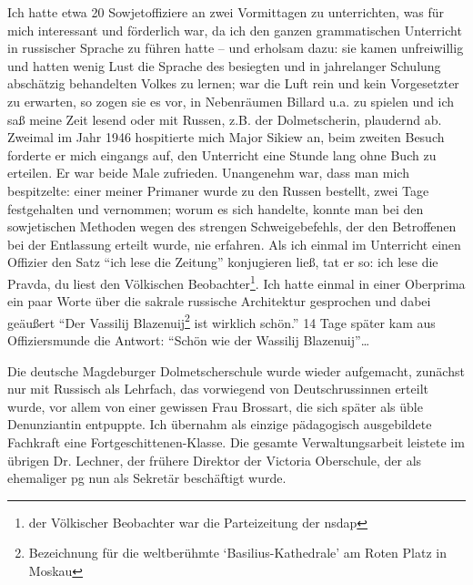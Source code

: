 \documentclass[a5paper,pagesize,10pt,twoside=true]{scrbook}
\renewcommand{\marginpar}[2][]{}
\begin{document}
Ich hatte etwa 20 Sowjetoffiziere an zwei Vormittagen zu unterrichten, was für mich interessant und förderlich war, da ich den ganzen grammatischen Unterricht in russischer Sprache zu führen hatte -- und erholsam dazu: sie kamen unfreiwillig und hatten wenig Lust die Sprache des besiegten und in jahrelanger Schulung abschätzig behandelten Volkes zu lernen; war die Luft rein und kein Vorgesetzter zu erwarten, so zogen sie es vor, in Nebenräumen Billard u.a. zu spielen und ich saß meine Zeit lesend oder mit Russen, z.B. der Dolmetscherin, plaudernd ab. Zweimal im Jahr 1946 hospitierte mich Major Sikiew an, beim zweiten Besuch forderte er mich eingangs auf, den Unterricht eine Stunde lang ohne Buch zu erteilen. Er war beide Male zufrieden. Unangenehm war, dass man mich bespitzelte: einer meiner Primaner wurde zu den Russen bestellt, zwei Tage festgehalten und vernommen; worum es sich handelte, konnte man bei den sowjetischen Methoden wegen des strengen Schweigebefehls, der den Betroffenen bei der Entlassung erteilt wurde, nie erfahren. Als ich einmal im Unterricht einen Offizier den Satz \enquote{ich lese die Zeitung} konjugieren ließ, tat er so: ich lese die Pravda, du liest den Völkischen Beobachter\footnote{der Völkischer Beobachter war die Parteizeitung der \ac{nsdap}}. \marginpar{130} Ich hatte einmal in einer Oberprima ein paar Worte über die sakrale russische Architektur gesprochen und dabei geäußert \enquote{Der Vassilij Blazenuij\footnote{Bezeichnung für die weltberühmte \enquote{Basilius-Kathedrale} am Roten Platz in Moskau} ist wirklich schön.} 14 Tage später kam aus Offiziersmunde die Antwort: \enquote{Schön wie der Wassilij Blazenuij}\dots

Die deutsche Magdeburger Dolmetscherschule wurde wieder aufgemacht, zunächst nur mit Russisch als Lehrfach, das vorwiegend von Deutschrussinnen erteilt wurde, vor allem von einer gewissen Frau Brossart, die sich später als üble Denunziantin entpuppte. Ich übernahm als einzige pädagogisch ausgebildete Fachkraft eine Fortgeschittenen-Klasse. Die gesamte Verwaltungsarbeit leistete im übrigen Dr. Lechner, der frühere Direktor der Victoria Oberschule, der als ehemaliger \ac{pg} nun als Sekretär beschäftigt wurde.
\end{document}
